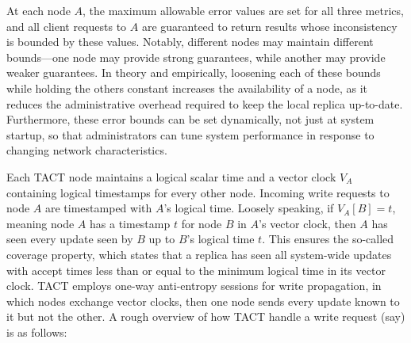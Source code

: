 At each node $A$, the maximum allowable error values are set for all
three metrics, and all client requests to $A$ are guaranteed to return
results whose inconsistency is bounded by these values. Notably,
different nodes may maintain different bounds---one node may provide
strong guarantees, while another may provide weaker guarantees. In
theory and empirically, loosening each of these bounds while holding
the others constant increases the availability of a node, as it
reduces the administrative overhead required to keep the local replica
up-to-date. Furthermore, these error bounds can be set dynamically,
not just at system startup, so that administrators can tune system
performance in response to changing network characteristics.

Each TACT node maintains a logical scalar time and a vector clock
$V_A$ containing logical timestamps for every other node. Incoming
write requests to node $A$ are timestamped with $A$'s logical
time. Loosely speaking, if $V_A[B]=t$, meaning node $A$ has a
timestamp $t$ for node $B$ in $A$'s vector clock, then $A$ has seen
every update seen by $B$ up to $B$'s logical time $t$.  This ensures
the so-called coverage property, which states that a replica has seen
all system-wide updates with accept times less than or equal to the
minimum logical time in its vector clock. TACT employs one-way
anti-entropy sessions for write propagation, in which nodes exchange
vector clocks, then one node sends every update known to it but not
the other. A rough overview of how TACT handle a write request (say)
is as follows:

